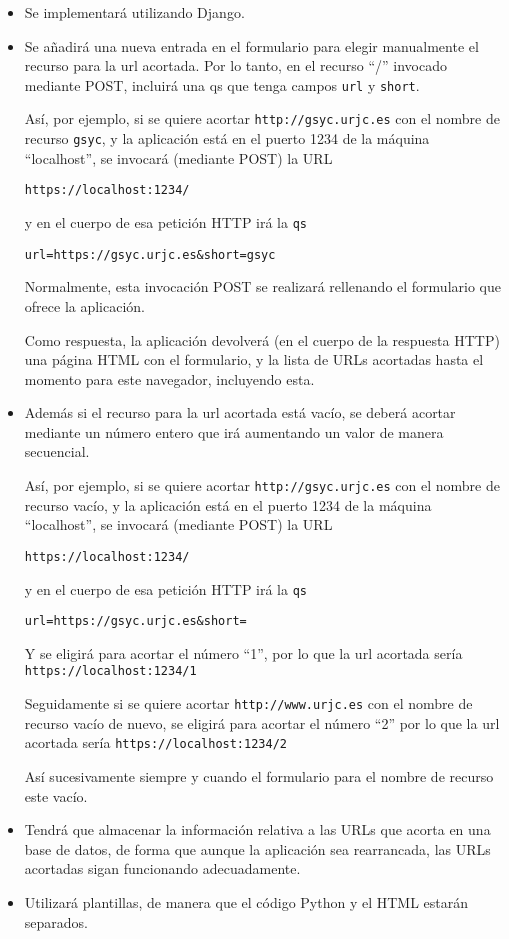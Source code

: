 \begin{itemize}
  \item Se implementará utilizando Django.
  \item Se añadirá una nueva entrada en el formulario para elegir manualmente el recurso para la url acortada. Por lo tanto, en el recurso ``/'' invocado mediante POST, incluirá una qs que tenga campos \texttt{url} y \texttt{short}. 
  
  Así, por ejemplo, si se quiere acortar \texttt{http://gsyc.urjc.es} con el nombre de recurso \texttt{gsyc}, y la aplicación está en el puerto 1234 de la máquina ``localhost'', se invocará (mediante POST) la URL

  \texttt{https://localhost:1234/}

  y en el cuerpo de esa petición HTTP irá la \texttt{qs}

  \verb|url=https://gsyc.urjc.es&short=gsyc|

  Normalmente, esta invocación POST se realizará rellenando el formulario que ofrece la aplicación.

  Como respuesta, la aplicación devolverá (en el cuerpo de la respuesta HTTP) una página HTML con el formulario, y la lista de URLs acortadas hasta el momento para este navegador, incluyendo esta.

  \item Además si el recurso para la url acortada está vacío, se deberá acortar mediante un número entero que irá aumentando un valor de manera secuencial.
  
  Así, por ejemplo, si se quiere acortar \texttt{http://gsyc.urjc.es} con el nombre de recurso vacío, y la aplicación está en el puerto 1234 de la máquina ``localhost'', se invocará (mediante POST) la URL

  \texttt{https://localhost:1234/}

  y en el cuerpo de esa petición HTTP irá la \texttt{qs}

  \verb|url=https://gsyc.urjc.es&short=|

  Y se eligirá para acortar el número ``1'', por lo que la url acortada sería \texttt{https://localhost:1234/1}

  Seguidamente si se quiere acortar \texttt{http://www.urjc.es} con el nombre de recurso vacío de nuevo, se eligirá para acortar el número ``2'' por lo que la url acortada sería \texttt{https://localhost:1234/2}

  Así sucesivamente siempre y cuando el formulario para el nombre de recurso este vacío.

  \item Tendrá que almacenar la información relativa a las URLs que acorta en una base de datos, de forma que aunque la aplicación sea rearrancada, las URLs acortadas sigan funcionando adecuadamente.
  \item Utilizará plantillas, de manera que el código Python y el HTML estarán separados.
\end{itemize}

